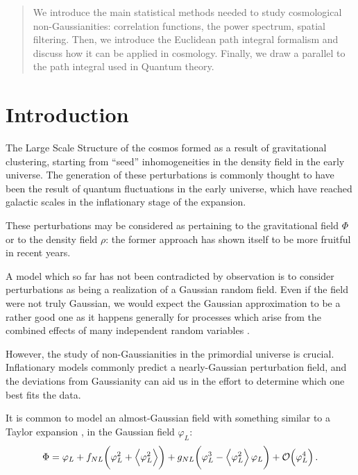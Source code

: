 \documentclass[main.tex]{subfiles}
\begin{document}
\begin{abstract}
    We introduce the main statistical methods needed to study cosmological non-Gaussianities: correlation functions, the power spectrum, spatial filtering.
    Then, we introduce the Euclidean path integral formalism and discuss how it can be applied in cosmology. 
    Finally, we draw a parallel to the path integral used in Quantum theory.
\end{abstract}

\section{Introduction}

The Large Scale Structure of the cosmos formed as a result of gravitational clustering, starting from ``seed'' inhomogeneities in the density field in the early universe. 
The generation of these perturbations is commonly thought to have been the result of quantum fluctuations in the early universe, which have reached galactic scales in the inflationary stage of the expansion. 

These perturbations may be considered as pertaining to the gravitational field \(\Phi \) or to the density field \(\rho \): the former approach has shown itself to be more fruitful in recent years.

A model which so far has not been contradicted by observation is to consider perturbations as being a realization of a Gaussian random field. 
Even if the field were not truly Gaussian, we would expect the Gaussian approximation to be a rather good one as it happens generally for processes which arise from the combined effects of many independent random variables \cite[pag.\ 2]{celoriaPrimordialNonGaussianity2018}. 

However, the study of non-Gaussianities in the primordial universe is crucial. Inflationary models commonly predict a nearly-Gaussian perturbation field, and the deviations from Gaussianity can aid us in the effort to determine which one best fits the data. 

It is common to model an almost-Gaussian field with something similar to a Taylor expansion \cite[eq.\ 1]{matarreseAbundanceHighRedshift2000}, \cite[eq.\ 1]{celoriaPrimordialNonGaussianity2018} in the Gaussian field \(\varphi _L\): 
%
\begin{align} \label{eq:perturbed-gaussian-field}
\Phi = \varphi _L + f_{NL} \qty(\varphi _L^2 + \expval{\varphi _L^2}) + g_{NL} \qty(\varphi _L^3 - \expval{\varphi _L^2} \varphi _L) + \order{\varphi _L^{4}} 
\,.
\end{align}
\end{document}
